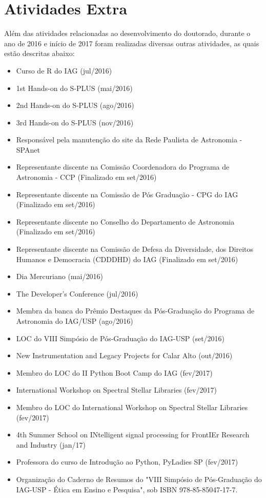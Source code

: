 \chapter{Atividades Extra}
\label{cap04}


Além das atividades relacionadas ao desenvolvimento do doutorado, durante o ano de 2016 e início de 2017 foram realizadas diversas outras atividades, as quais estão descritas abaixo:

\begin{itemize}
\item Curso de R do IAG (jul/2016)
\item 1st Hands-on do S-PLUS (mai/2016)
\item 2nd Hands-on do S-PLUS (ago/2016)
\item 3rd Hands-on do S-PLUS (nov/2016)
\item Responsável pela manutenção do site da Rede Paulista de Astronomia - SPAnet
\item Representante discente na Comissão Coordenadora do Programa de Astronomia - CCP (Finalizado em set/2016)
\item Representante discente na Comissão de Pós Graduação - CPG do IAG (Finalizado em set/2016)
\item Representante discente no Conselho do Departamento de Astronomia (Finalizado em set/2016)
\item Representante discente na Comissão de Defesa da Diversidade, dos Direitos Humanos e Democracia (CDDDHD) do IAG (Finalizado em set/2016)
\item Dia Mercuriano (mai/2016)
\item The Developer's Conference (jul/2016)
\item Membra da banca do Prêmio Destaques da Pós-Graduação do Programa de Astronomia do IAG/USP (ago/2016)
\item LOC do VIII Simpósio de Pós-Graduação do IAG-USP (set/2016)
\item New Instrumentation and Legacy Projects for Calar Alto (out/2016)
\item Membro do LOC do II Python Boot Camp do IAG (fev/2017)
\item International Workshop on Spectral Stellar Libraries (fev/2017)
\item Membro do LOC do International Workshop on Spectral Stellar Libraries (fev/2017)
\item 4th Summer School on INtelligent signal processing for FrontIEr Research and Industry (jan/17)
\item Professora do curso de Introdução ao Python, PyLadies SP (fev/2017)
\item Organização do Caderno de Resumos do "VIII Simpósio de Pós-Graduação do IAG-USP - Ética em Ensino e Pesquisa", sob ISBN 978-85-85047-17-7.
\end{itemize}
